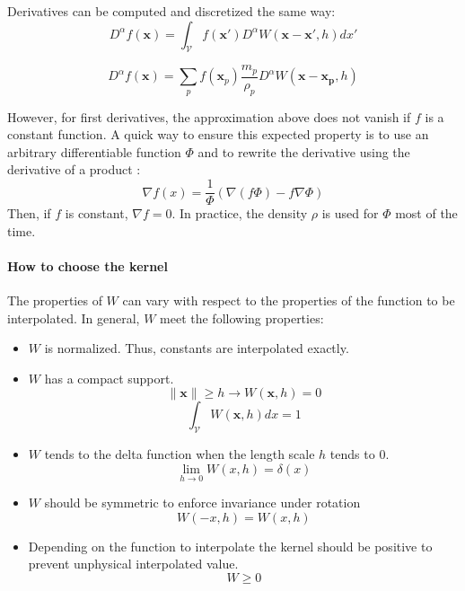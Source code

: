 Derivatives can be computed and discretized the same way:
\begin{equation}
D^{\alpha} f(\mathbf{x}) = \int_{\mathcal{V}} f(\mathbf{x'}) D^{\alpha} W(\mathbf{x}-\mathbf{x'}, h)dx'
\end{equation}

\begin{equation}
\label{eq:sphDerivative}
D^{\alpha} f(\mathbf{x})= \sum_{p} f(\mathbf{x}_{p})\frac{m_{p}}{\rho_{p}} D^{\alpha} W(\mathbf{x}-\mathbf{x_{p}},h)
\end{equation}

However, for first derivatives, the approximation above does not vanish if $f$ is a constant function. 
A quick way to ensure this expected property is to use an arbitrary differentiable function $\Phi$ and to rewrite the derivative using the derivative of a product :
\begin{equation}
\label{eq:hackSPH}
\nabla f(x) = \frac{1}{\Phi}\left(\nabla (f \Phi) - f \nabla \Phi \right)
\end{equation}
Then, if $f$ is constant, $\nabla f = 0$.
In practice, the density $\rho$ is used for $\Phi$ most of the time.

\paragraph{How to choose the kernel}
The properties of $W$ can vary with respect to the properties of the function to be interpolated. In general, $W$ meet the following properties:
\begin{itemize}
\item $W$ is normalized. Thus, constants are interpolated exactly.
\item $W$ has a compact support.
\begin{equation}
\parallel \mathbf{x} \parallel \geq h \rightarrow W(\mathbf{x},h) = 0 
\end{equation}
\begin{equation}
\int_{\mathcal{V}} W(\mathbf{x},h) dx = 1
\end{equation}
\item $W$ tends to the delta function when the length scale $h$ tends to $0$.
\begin{equation}
\lim_{h \rightarrow 0} W(x,h) = \delta(x)
\end{equation}
\item $W$ should be symmetric to enforce invariance under rotation
\begin{equation}
W(-x,h) = W(x,h)
\end{equation}
\item Depending on the function to interpolate the kernel should be positive to prevent unphysical interpolated value.
\begin{equation}
W \geq 0
\end{equation}
\end{itemize}

